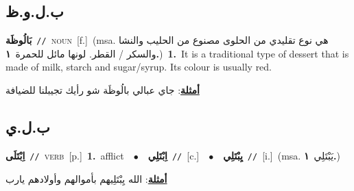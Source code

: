 \documentclass[10pt,a4paper,twoside]{article} %
\begin{document}
\begin{multicols}{2}
\vspace{-3mm}
\subsection*{\color{blue}\foreignlanguage{arabic}{ب.ل.و.ظ}\color{blue}{ (ntws)}} 

{\setlength\topsep{0pt}\textbf{\foreignlanguage{arabic}{بَالُوظَة}}\ {\color{gray}\texttt{//}\color{black}}\ \textsc{noun}\ [f.]\ \color{gray}(msa. \foreignlanguage{arabic}{هي نوع تقليدي من الحلوى مصنوع من الحليب والنشا والسكر / القطر. لونها مائل للحمرة}~\foreignlanguage{arabic}{\textbf{١.}})\color{black}\ \textbf{1.}~It is a traditional type of dessert that is made of milk, starch and sugar/syrup. Its colour is usually red.\  \begin{flushright}\color{gray}\foreignlanguage{arabic}{\textbf{\underline{\foreignlanguage{arabic}{أمثلة}}}: جاي عبالي بالُوظَة شو رأيك تجيبلنا للضيافة}\end{flushright}\color{black}} \vspace{2mm}

\vspace{-3mm}
\subsection*{\color{blue}\foreignlanguage{arabic}{ب.ل.ي}\color{blue}{}} 

{\setlength\topsep{0pt}\textbf{\foreignlanguage{arabic}{اِبْتَلَى}}\ {\color{gray}\texttt{//}\color{black}}\ \textsc{verb}\ [p.]\ \textbf{1.}~afflict\ \ $\bullet$\ \ \setlength\topsep{0pt}\textbf{\foreignlanguage{arabic}{اِبْتَلِي}}\ {\color{gray}\texttt{//}\color{black}}\ [c.]\ \ $\bullet$\ \ \setlength\topsep{0pt}\textbf{\foreignlanguage{arabic}{يِبْتَلِي}}\ {\color{gray}\texttt{//}\color{black}}\ [i.]\ \color{gray}(msa. \foreignlanguage{arabic}{يَبْتَلِي}~\foreignlanguage{arabic}{\textbf{١.}})\color{black}\  \begin{flushright}\color{gray}\foreignlanguage{arabic}{\textbf{\underline{\foreignlanguage{arabic}{أمثلة}}}: الله يِبْتَلِيهم بأموالهم وأولادهم يارب}\end{flushright}\color{black}} \vspace{2mm}


\end{multicols}
\end{document}
